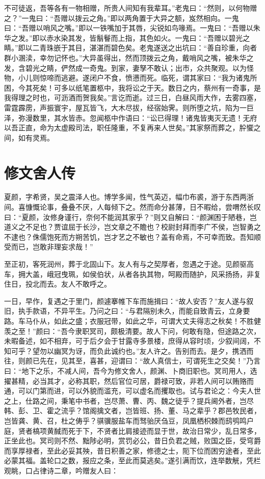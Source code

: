 \documentclass[a4paper,12pt,UTF8,twoside]{ctexbook}
\begin{document}
不可徒返，吾等各有一物相赠，所贵人间知有我辈耳。”老鬼曰：“然则，以何物赠之？”一鬼曰：“吾赠以拨云之角。”即以两角置于大异之额，岌然相向。一鬼曰：“吾赠以哨风之嘴。”即以一铁嘴加于其唇，尖锐如鸟喙焉。一鬼曰：“吾赠以朱华之发。”即以赤水染其发，皆鬅鬙而上指，其色如火。一鬼曰：“吾赠以碧光之睛。”即以二青珠嵌于其目，湛湛而碧色矣。老鬼遂送之出坑曰：“善自珍重，向者群小溷渎，幸勿记怀也。”大异虽得出，然而顶拨云之角，戴哨风之嘴，被朱华之发，含碧光之睛，俨然成一奇鬼。到家，妻孥不敢认；出市，众共聚观。以为怪物，小儿则惊啼而逃避。遂闭户不食，愤懑而死。临死，谓其家曰：“我为诸鬼所困，今其死矣！可多以纸笔置柩中，我将讼之于天。数日之内，蔡州有一奇事，是我得理之时也，可沥酒而贺我矣。”言讫而逝。过三日，白昼风雨大作，去雾四塞，雷霆霹雳，声振寰宇，屋瓦皆飞，大木尽拔，经宿始霁。则所堕之坑，陷为一巨泽，弥漫数里，其水皆赤。忽闻柩中作语曰：“讼已得理！诸鬼皆夷灭无遗！无府以吾正直，命为太虚殿司法，职任隆重，不复再来人世矣。”其家祭而葬之，肸蠁之间，如有灵焉。

\chapter{修文舍人传}

夏颜，字希贤，吴之震泽人也。博学多闻，性气英迈，幅巾布裘，游于东西两浙间。喜慷慨论事，叠叠不厌，人每倾下之。然而命分甚薄，日不暇给，尝喟然长叹曰：“夏颜，汝修身谨行，奈何不能润其家乎？”则又自解曰：“颜渊困于陋巷，岂道义之不足也？贾谊屈于长沙，岂文章之不贍也？校尉封拜而李广不侯，岂智勇之不逮也？侏儒饱死而方朔苦饥，岂才艺之不敏也？盖有命焉，不可幸而致。吾知顺受而已，岂敢非理妄求哉！”

至正初，客死润州，葬于北固山下。友人有与之契厚者，忽遇之于途。见颜驱高车，拥大盖，峨冠曳珮，如侯伯状，从者各执其物，呵殿而随护，风采扬扬，非复住日，投北而去。友人不敢呼之。

一日，早作，复遇之于里门，颜遽搴帷下车而施揖曰：“故人安否？”友人遂与叙旧，执手款语，不异平生。乃问之曰：“与君隔别未久，而能自致青云，立身要路。车马仆从，如此之盛；衣服冠带，如此之华，可谓大丈夫得志之秋矣！不胜健羡之至！”颜曰：“吾今隶职冥司，颇极清要。故人下问，何敢有隐，但途路之次，未暇备述，如不相弃，可于后夕会于甘露寺多景楼，庶得从容时顷，少叙间阔，不知可乎？望勿以幽冥为讶，而负此诚约也。”友人许之。告别而去。是夕，携洒而往，则颜已先在，见其至，喜甚，迎谓曰：“故人真信士，可谓死生之交矣！”乃言曰：“地下之乐，不减人间，吾今为修文舍人，颜渊、卜商旧职也。冥司用人，选擢甚精，必当其才，必称其职，然后官位可居，爵禄可致，非若人间可以贿赂而通，可以门第而进，可以外貌而滥充，可以虚名而攫取也。试与君论之：今夫人世之上，仕路之间，秉笔中书者，岂尽萧、曹、丙、魏之徒乎？提兵阃外者，岂尽韩、彭、卫、霍之流乎？馆阁擒文者，岂皆班、扬、董、马之辈乎？郡邑牧民者，岂皆龚、黄、召，杜之俦乎？骐骥服盐车而驽骀厌刍豆，凤凰栖枳棘而鸱鸮鸣户庭，贤者槁项黄馘而死于下，不贤者比肩接迹而显于世，故治日常少，乱日常多，正坐此也。冥司则不然、黜陟必明，赏罚必公，昔日负君之贼，败国之臣，受穹爵而享厚禄者，至此必妥其殃，昔日积善之家，修德之士，阨下位而困穷途者，至此必蒙其福。盖轮口之数，报应之条，至此而莫逃矣。”遂引满而饮，连举数觥，凭栏观眺，口占律诗二章，吟赠友人曰：
\end{document}
